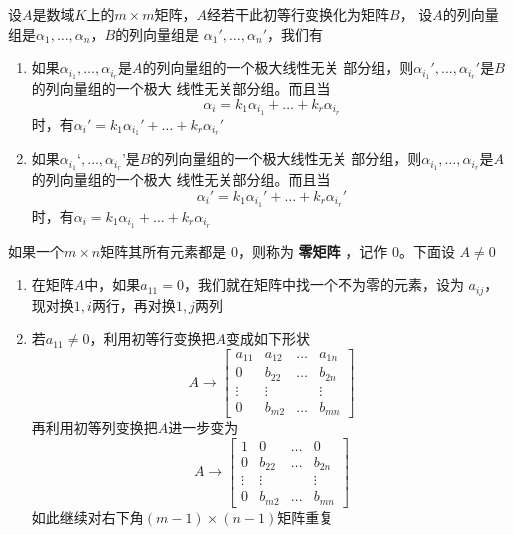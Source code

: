 \documentclass[11pt]{article}
\begin{document}
\begin{corollary}[]
设\(A\)是数域\(K\)上的\(m\times m\)矩阵，\(A\)经若干此初等行变换化为矩阵\(B\)，
设\(A\)的列向量组是\(\alpha_1,\dots,\alpha_n\)，\(B\)的列向量组是
\(\alpha_1',\dots,\alpha_n'\)，我们有
\begin{enumerate}
\item 如果\(\alpha_{i_1},\dots,\alpha_{i_r}\)是\(A\)的列向量组的一个极大线性无关
部分组，则\(\alpha_{i_1}',\dots,\alpha_{i_r}'\)是\(B\)的列向量组的一个极大
线性无关部分组。而且当
\begin{equation*}
\alpha_i=k_1\alpha_{i_1}+\dots+k_r\alpha_{i_r}
\end{equation*}
时，有\(\alpha_i'=k_1\alpha_{i_1}'+\dots+k_r\alpha_{i_r}'\)
\item 如果\(\alpha_{i_1}‘,\dots,\alpha_{i_r}’\)是\(B\)的列向量组的一个极大线性无关
部分组，则\(\alpha_{i_1},\dots,\alpha_{i_r}\)是\(A\)的列向量组的一个极大
线性无关部分组。而且当
\begin{equation*}
\alpha_i'=k_1\alpha_{i_1}'+\dots+k_r\alpha_{i_r}'
\end{equation*}
时，有\(\alpha_i=k_1\alpha_{i_1}+\dots+k_r\alpha_{i_r}\)
\end{enumerate}
\end{corollary}

如果一个\(m\times n\)矩阵其所有元素都是 0，则称为 \textbf{零矩阵} ，记作 0。下面设
\(A\neq0\)
\begin{enumerate}
\item 在矩阵\(A\)中，如果\(a_{11}=0\)，我们就在矩阵中找一个不为零的元素，设为
\(a_{ij}\)，现对换\(1,i\)两行，再对换\(1,j\)两列
\item 若\(a_{11}\neq0\)，利用初等行变换把\(A\)变成如下形状
\begin{equation*}
A\to
\begin{bmatrix}
a_{11}&a_{12}&\dots&a_{1n}\\
0&b_{22}&\dots&b_{2n}\\
\vdots&\vdots&&\vdots\\
0&b_{m2}&\dots&b_{mn}
\end{bmatrix}
\end{equation*}
再利用初等列变换把\(A\)进一步变为
\begin{equation*}
A\to
\begin{bmatrix}
1&0&\dots&0\\
0&b_{22}&\dots&b_{2n}\\
\vdots&\vdots&&\vdots\\
0&b_{m2}&\dots&b_{mn}
\end{bmatrix}
\end{equation*}
如此继续对右下角\((m-1)\times(n-1)\)矩阵重复
\end{enumerate}
\end{document}
